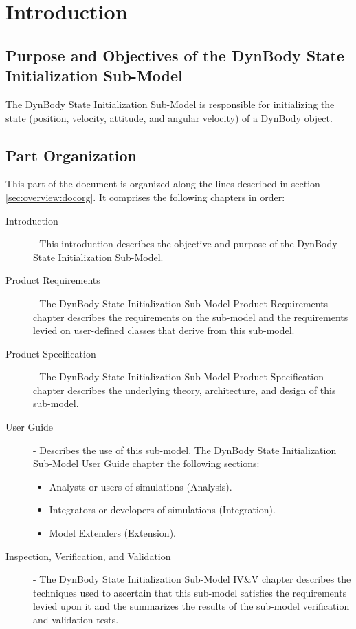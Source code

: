 %
\chapter{Introduction}\label{ch:DynBodyInit:intro}

\section{Purpose and Objectives of the
DynBody State Initialization Sub-Model}

The DynBody State Initialization Sub-Model
is responsible for initializing the state
(position, velocity, attitude, and angular velocity) of
a DynBody object.

\section{Part Organization}
This part of the \ModelDesc document is organized along the
lines described in section \ref{sec:overview:docorg}. It
comprises the following chapters in order:

\begin{description}
\item[Introduction] -
This introduction describes the objective and purpose of the
DynBody State Initialization Sub-Model.

\item[Product Requirements] -
The DynBody State Initialization Sub-Model Product Requirements chapter
describes the requirements on the sub-model
and the requirements levied on user-defined classes that derive from
this sub-model.

\item[Product Specification] -
The DynBody State Initialization Sub-Model Product Specification chapter
describes the underlying theory, architecture, and design of
this sub-model.

\item[User Guide] -
Describes the use of this sub-model.
The DynBody State Initialization Sub-Model User Guide chapter
the following sections:
\begin{itemize}
 \item Analysts or users of simulations (Analysis).
 \item Integrators or developers of simulations (Integration).
 \item Model Extenders (Extension).
\end{itemize}

\item[Inspection, Verification, and Validation] -
The DynBody State Initialization Sub-Model IV\&V chapter
describes the techniques used to ascertain that
this sub-model satisfies the requirements levied upon it
and the summarizes the results of
the sub-model verification and validation tests.
\end{description}
